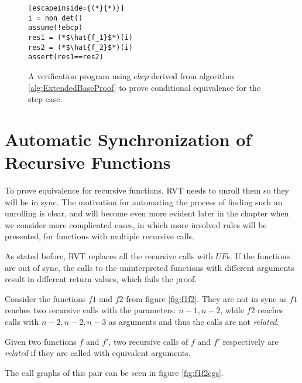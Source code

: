 \begin{figure} [h]
\begin{center}
\begin{minipage}{7 cm}
\begin{lstlisting}[escapeinside={(*}{*)}]
i = non_det()
assume(!ebcp)
res1 = (*$\hat{f_1}$*)(i)
res2 = (*$\hat{f_2}$*)(i)
assert(res1==res2)
\end{lstlisting}
\end{minipage}
\caption{A verification program using $ebcp$ derived from algorithm \ref{alg:ExtendedBaseProof} to prove conditional equivalence for the step case.}
\label{fig:stepvefprogram}
\end{center}
\end{figure}

\section{Automatic Synchronization of Recursive Functions}
To prove equivalence for recursive functions, RVT needs to unroll them so they will be in sync. The motivation for automating the process of finding such an unrolling is clear, and will become even more evident later in the chapter when we consider more complicated cases, in which more involved rules will be presented, for functions with multiple recursive calls. 

As stated before, RVT replaces all the recursive calls with $UF$s. If the functions are out of sync, the calls to the uninterpreted functions with different arguments result in different return values, which fails the proof.

Consider the functions $f1$ and $f2$ from figure \ref{fig:f1f2}.
They are not in sync as $f1$ reaches two recursive calls with the parameters: $n-1,n-2$, while $f2$ reaches calls with $n-2,n-2,n-3$ as arguments and thus the calls are not \emph{related}.
\begin{definition}
\label{def:relatedcalls}
Given two functions $f$ and $f'$, two recursive calls of $f$ and $f'$ respectively are \emph{related}  if they are called with equivalent arguments.  
\end{definition}
The call graphs of this pair can be seen in figure \ref{fig:f1f2cgs}.

